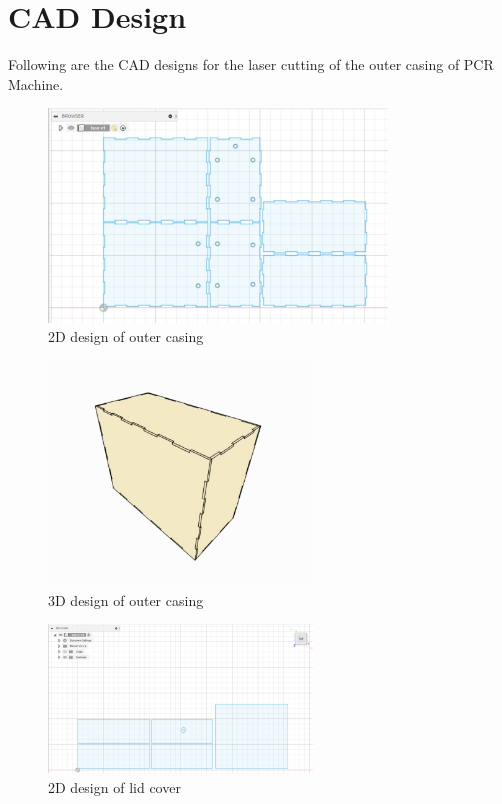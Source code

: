 \documentclass[12pt]{article}
\begin{document}
\pagebreak

\section{CAD Design}
Following are the CAD designs for the laser cutting of the outer casing of PCR Machine.
\begin{figure}[h]
    \centering
    \includegraphics[width=9cm]{casing 2d.jpeg}
    \caption{2D design of outer casing}
    \label{fig:galaxy}
\end{figure}

\begin{figure}[h]
    \centering
    \includegraphics[width=7cm]{casing 3d.jpeg}
    \caption{3D design of outer casing}
    \label{fig:galaxy}
\end{figure}

\begin{figure}[h]
    \centering
    \includegraphics[width=7cm]{lid 2d.jpeg}
    \caption{2D design of lid cover}
    \label{fig:galaxy}
\end{figure}
\end{document}
